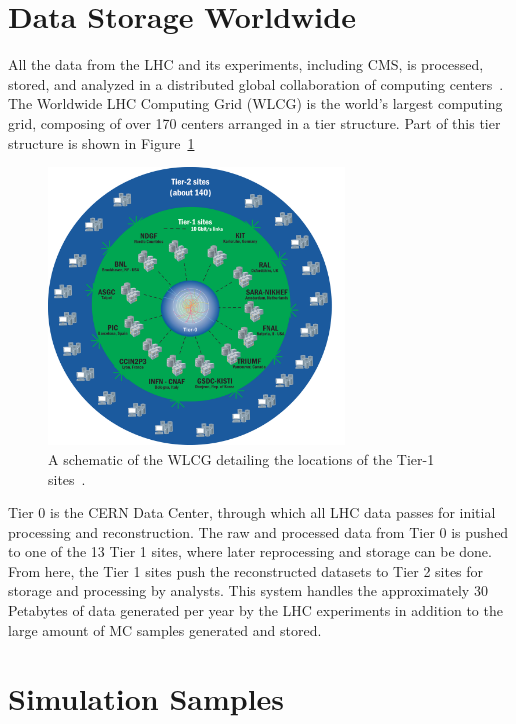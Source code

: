 \section{Data Storage Worldwide\label{sec:storage}}

All the data from the LHC and its experiments, including CMS, is processed, stored, and analyzed
in a distributed global collaboration of computing centers~\cite{Eck:840543}. The Worldwide
LHC Computing Grid (WLCG) is the world's largest computing grid, composing of over 170 centers
arranged in a tier structure. Part of this tier structure is shown in Figure~\ref{fig:cerncomputing}

\begin{figure}[ht]
 \begin{center}
    \includegraphics[width=0.70\textwidth]{figures/data/CCApr13-Tiers0-1-2_PNG-file.pdf}
      \end{center}
\caption{A schematic of the WLCG detailing the locations of the Tier-1 sites~\cite{cern:computing}.}
\label{fig:cerncomputing}
\end{figure}

Tier 0 is the CERN Data Center, through which all LHC data passes for initial processing and
reconstruction. The raw and processed data from Tier 0 is pushed to one of the 13 Tier 1 sites, where
later reprocessing and storage can be done. From here, the Tier 1 sites push the reconstructed
datasets to Tier 2 sites for storage and processing by analysts. This system handles the approximately
30 Petabytes of data generated per year by the LHC experiments in addition to the large amount of
MC samples generated and stored.

\section{Simulation Samples\label{sec:sim}}


